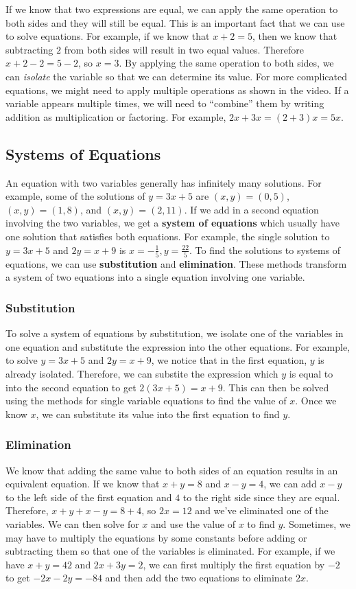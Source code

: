 \documentclass{article}
\begin{document}
    If we know that two expressions are equal, we can apply the same operation to both sides and they will still be equal. This is an important fact that we can use to solve equations. For example, if we know that $x + 2 = 5$, then we know that subtracting $2$ from both sides will result in two equal values. Therefore $x + 2 - 2 = 5 - 2$, so $x = 3$. By applying the same operation to both sides, we can \emph{isolate} the variable so that we can determine its value. For more complicated equations, we might need to apply multiple operations as shown in the video. If a variable appears multiple times, we will need to ``combine'' them by writing addition as multiplication or factoring. For example, $2x + 3x = (2 + 3)x = 5x$.
    \subsection*{Systems of Equations}
    An equation with two variables generally has infinitely many solutions. For example, some of the solutions of $y = 3x + 5$ are $(x, y) = (0, 5)$, $(x, y) = (1, 8)$, and $(x, y) = (2, 11)$. If we add in a second equation involving the two variables, we get a \textbf{system of equations} which usually have one solution that satisfies both equations. For example, the single solution to $y = 3x + 5$ and $2y = x + 9$ is $x = -\frac{1}{5}, y = \frac{22}{5}$. To find the solutions to systems of equations, we can use \textbf{substitution} and \textbf{elimination}. These methods transform a system of two equations into a single equation involving one variable.
    \subsubsection*{Substitution}
    To solve a system of equations by substitution, we isolate one of the variables in one equation and substitute the expression into the other equations. For example, to solve $y = 3x + 5$ and $2y = x + 9$, we notice that in the first equation, $y$ is already isolated. Therefore, we can substite the expression which $y$ is equal to into the second equation to get $2(3x + 5) = x + 9$. This can then be solved using the methods for single variable equations to find the value of $x$. Once we know $x$, we can substitute its value into the first equation to find $y$.
    \subsubsection*{Elimination}
    We know that adding the same value to both sides of an equation results in an equivalent equation. If we know that $x + y = 8$ and $x - y = 4$, we can add $x - y$ to the left side of the first equation and $4$ to the right side since they are equal. Therefore, $x + y + x - y = 8 + 4$, so $2x = 12$ and we've eliminated one of the variables. We can then solve for $x$ and use the value of $x$ to find $y$. Sometimes, we may have to multiply the equations by some constants before adding or subtracting them so that one of the variables is eliminated. For example, if we have $x + y = 42$ and $2x + 3y = 2$, we can first multiply the first equation by $-2$ to get $-2x - 2y = -84$ and then add the two equations to eliminate $2x$.
\end{document}
